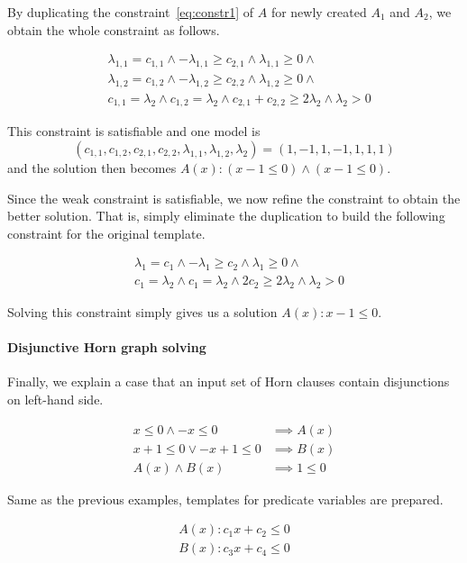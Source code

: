 \documentclass[a4paper,12pt]{article}
\begin{document}
By duplicating the constraint~\ref{eq:constr1} of $A$ for newly
created $A_1$ and $A_2$, we obtain the whole constraint as follows.

\begin{align*}
& \lambda_{1,1} = c_{1,1} \wedge - \lambda_{1,1} \geq c_{2,1} \wedge \lambda_{1,1} \geq 0 \wedge \\
& \lambda_{1,2} = c_{1,2} \wedge - \lambda_{1,2} \geq c_{2,2} \wedge \lambda_{1,2} \geq 0 \wedge \\
& c_{1,1} = \lambda_2 \wedge c_{1,2} = \lambda_2 \wedge c_{2,1} + c_{2,2} \geq 2 \lambda_2 \wedge \lambda_2 > 0
\end{align*}

This constraint is satisfiable and one model is
\[ ( c_{1,1}, c_{1,2}, c_{2,1}, c_{2,2}, \lambda_{1,1}, \lambda_{1,2}, \lambda_2 ) =
( 1, -1, 1, -1, 1, 1, 1 ) \] and the solution then becomes
$A(x) : (x -1 \leq 0) \wedge (x -1 \leq 0)$.

Since the weak constraint is satisfiable, we now refine the constraint
to obtain the better solution. That is, simply eliminate the
duplication to build the following constraint for the original template.

\begin{align*}
& \lambda_1 = c_1 \wedge - \lambda_1 \geq c_2 \wedge \lambda_1 \geq 0 \wedge \\
& c_1 = \lambda_2 \wedge c_1 = \lambda_2 \wedge 2 c_2 \geq 2 \lambda_2 \wedge \lambda_2 > 0
\end{align*}

Solving this constraint simply gives us a solution $A(x) : x -1 \leq 0$.

\paragraph {Disjunctive Horn graph solving}
Finally, we explain a case that an input set of Horn clauses contain
disjunctions on left-hand side.

\begin{align*}
x \leq 0 \wedge -x \leq 0 & \implies A(x) \\
x+1 \leq 0 \vee -x+1 \leq 0 & \implies B(x) \\
A(x) \wedge B(x) & \implies 1 \leq 0
\end{align*}

Same as the previous examples, templates for predicate variables are
prepared.

\begin{align*}
A(x) : c_1 x + c_2 \leq 0 \\ B(x) : c_3 x + c_4 \leq 0
\end{align*}
\end{document}
